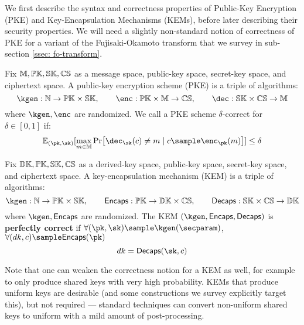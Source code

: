 We first describe the syntax and correctness properties of Public-Key Encryption (PKE) and Key-Encapsulation Mechanisms (KEMs), before later describing their security properties.
We will need a slightly non-standard notion of correctness of PKE for a variant of the Fujisaki-Okamoto transform \cite{TCC:HofHovKil17} that we survey in sub-section \ref{ssec: fo-transform}.
\begin{definition}\label{def: pke}
	Fix $\mathbb{M}, \mathbb{PK}, \mathbb{SK}, \mathbb{CS}$ as a message space, public-key space, secret-key space, and ciphertext space.
	A public-key encryption scheme (PKE) is a triple of algorithms:
	\begin{equation*}
	\kgen : \Nset\to \setfont{PK}\times \setfont{SK},\qquad \enc : \setfont{PK}\times\setfont{M}\to \setfont{CS},\qquad \dec : \setfont{SK}\times\setfont{CS}\to \setfont{M}
	\end{equation*}
	where $\kgen, \enc$ are randomized.
	We call a PKE scheme $\delta$-correct for $\delta\in[0,1]$ if:
	\begin{equation*}
	\expectation_{(\pk, \sk)}[\max_{m\in\setfont{M}}\Pr[\dec_{\sk}(c) \neq m\mid c\sample \enc_{\pk}(m)]] \leq \delta
	\end{equation*}
\end{definition}


\begin{definition}
	Fix $\mathbb{DK}, \mathbb{PK}, \mathbb{SK}, \mathbb{CS}$ as a derived-key space, public-key space, secret-key space, and ciphertext space.
	A key-encapsulation mechanism (KEM) is a triple of algorithms:
	\begin{equation*}
	\kgen : \Nset\to \setfont{PK}\times \setfont{SK},\qquad \encaps : \setfont{PK}\to \setfont{DK}\times\setfont{CS},\qquad \decaps : \setfont{SK}\times\setfont{CS}\to \setfont{DK}
	\end{equation*}
	where $\kgen, \encaps$ are randomized.
	The KEM $(\kgen, \encaps, \decaps)$ is \textbf{perfectly correct} if $\forall (\pk,\sk)\sample \kgen(\secparam)$, $\forall(dk, c)\sample \encaps(\pk)$
	\begin{equation*}
	dk = \decaps(\sk, c)
	\end{equation*}
\end{definition}
Note that one can weaken the correctness notion for a KEM as well, for example to only produce shared keys with very high probability.
KEMs that produce uniform keys are desirable (and some constructions we survey explicitly target this), but not required --- standard techniques can convert non-uniform shared keys to uniform with a mild amount of post-processing.

